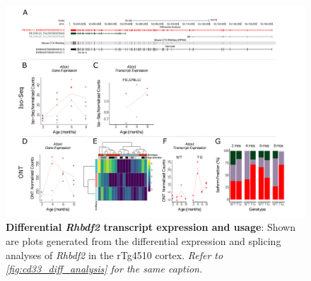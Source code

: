 \begin{landscape}
	\begin{figure}[htp]
		\begin{center}
			\includegraphics[page=14,trim={0 0.5cm 0 1.5cm},scale =0.85]{Figures/TargetGene_DifferentialAnalysis.pdf}
		\end{center}
		\captionsetup{width=1.5\textwidth}
		\caption[Differential \textit{Rhbdf2} transcript expression and usage]%
		{\textbf{Differential \textit{Rhbdf2} transcript expression and usage}: Shown are plots generated from the differential expression and splicing analyses of \textit{Rhbdf2} in the rTg4510 cortex. \textit{Refer to \cref{fig:cd33_diff_analysis} for the same caption.}}   
		\label{fig:Rhbdf2_diff_analysis}
	\end{figure}
\end{landscape}

